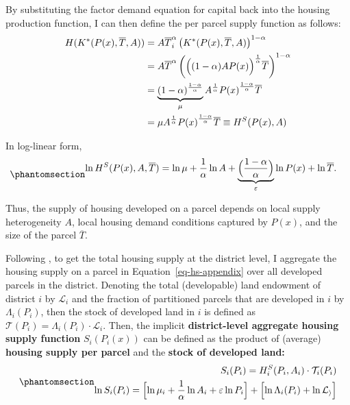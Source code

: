 \documentclass[
  12pt,
]{article}
\begin{document}
By substituting the factor demand equation for capital back into the
housing production function, I can then define the per parcel supply
function as follows: \[
\begin{aligned}
H(K^*(P(x), \overline{T}, A)) &= A \overline{T}^\alpha_i \left(K^*(P(x), \overline{T}, A)\right)^{1-\alpha}\\
&= A \overline{T}^\alpha \left(\Bigl((1-\alpha)AP(x)\Bigr)^{\frac{1}{\alpha}}\overline{T}\right)^{1-\alpha}\\
&=\underbrace{(1-\alpha)^{\frac{1-\alpha}{\alpha}}}_{\mu}A^{\frac{1}{\alpha}}{P(x)}^{\frac{1-\alpha}{\alpha}}\overline{T}\\
&=\mu A^{\frac{1}{\alpha}}{P(x)}^{\frac{1-\alpha}{\alpha}}\overline{T} \equiv H^S(P(x), A)
\end{aligned}
\]

In log-linear form,
\begin{equation}\protect\phantomsection\label{eq-hs-appendix}{
\begin{aligned}
\ln H^S(P(x), A, \overline{T}) &= \ln \mu + \frac{1}{\alpha}\ln A + \underbrace{\Bigl(\frac{1-\alpha}{\alpha}\Bigr)}_{\varepsilon}\ln P(x) + \ln \overline{T}.
\end{aligned}
}\end{equation}

Thus, the supply of housing developed on a parcel depends on local
supply heterogeneity \(A\), local housing demand conditions captured by
\(P(x)\), and the size of the parcel \(\overline{T}\).

Following \citet{baum-snow_han_2019}, to get the total housing supply at
the district level, I aggregate the housing supply on a parcel in
Equation~\ref{eq-hs-appendix} over all developed parcels in the
district. Denoting the total (developable) land endowment of district
\(i\) by \(\mathcal{L}_{i}\) and the fraction of partitioned parcels
that are developed in \(i\) by \(\Lambda_i (P_i)\), then the stock of
developed land in \(i\) is defined as
\(\mathcal{T}(P_i) = \Lambda_i(P_i) \cdot \mathcal{L}_{i}\). Then, the
implicit \textbf{district-level aggregate housing supply function}
\(S_i(P_i(x))\) can be defined as the product of (average)
\textbf{housing supply per parcel} and the \textbf{stock of developed
land:}
\begin{equation}\protect\phantomsection\label{eq-agg-hs-appendix}{
\begin{aligned}
S_i(P_i) = H_i^S(P_i, A_i)\cdot \mathcal{T}_{i}(P_i)\\ 
\ln S_i(P_i) = \Bigl[\ln \mu_i + \frac{1}{\alpha}\ln A_i + \varepsilon\ln P_i \Bigr]+ \Bigl[\ln\Lambda_i(P_i) + \ln\mathcal{L_i}\Bigr]
\end{aligned}
}\end{equation}
\end{document}
